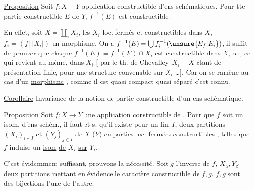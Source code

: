 \uline{Proposition} Soit $f:X-Y$  application constructible d'ens schématiques. Pour tte partie constructible $E$ de $Y$, $f^{-1}(E)$ est constructible.


En effet, soit $X=\coprod_iX_i$, les $X_i$ loc. fermés et constructibles dans $X$,  $f_i=(f\,|\,|X_i|)$ un morphisme. On a $f^{-1}(E)=\bigcup f_i^{-1}(\unsure{E_f|E_i})$, il suffit de prouver que chaque $f^{-1}(E)=f^{-1}(E)\cap X_i$ est constructible dans $X$, ou, ce qui revient au même, dans $X_i$ [ par le th. de Chevalley,  $X_i-X$ étant de présentation finie, pour une structure  convenable sur $X_i$ \ldots]. Car on se ramène au cas d'un \uline{morphisme} , comme il est quasi-compact quasi-séparé c'est connu.


\uline{Corollaire} Invariance de la notion de partie constructible d'un ens schématique.

\uline{Proposition} Soit $f:X\longrightarrow Y$ une application constructible de  . Pour que $f$ soit un isom. d'ens schém., il faut et s. qu'il existe  pour un fini $I$, deux partitions $(X_i)_{i\in I}$ et $(Y_j)_{j\in I}$ de $X$ ($Y$) en parties loc. fermées constructibles , telles que $f$ induise un \uline{isom} \uline{de} $X_i$ \uline{sur} $Y_i$.

C'est évidemment suffisant, prouvons la nécessité. Soit $g$ l'inverse de $f$, $X_\alpha,Y_\beta$ deux partitions  mettant en évidence le caractère constructible de $f,g$.  $f,g$ sont des bijections  l'une de l'autre.

